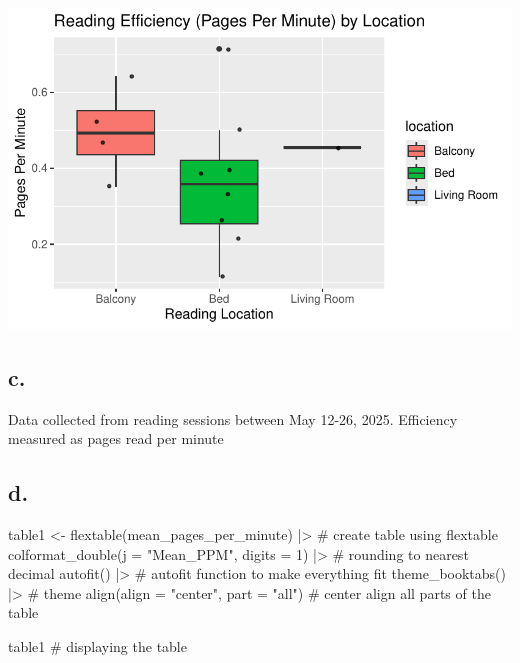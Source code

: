 \documentclass[
  letterpaper,
  DIV=11,
  numbers=noendperiod]{scrartcl}
\newenvironment{Shaded}{\begin{snugshade}}{\end{snugshade}}
\newcommand{\AttributeTok}[1]{\textcolor[rgb]{0.40,0.45,0.13}{#1}}
\newcommand{\CommentTok}[1]{\textcolor[rgb]{0.37,0.37,0.37}{#1}}
\newcommand{\DecValTok}[1]{\textcolor[rgb]{0.68,0.00,0.00}{#1}}
\newcommand{\FunctionTok}[1]{\textcolor[rgb]{0.28,0.35,0.67}{#1}}
\newcommand{\NormalTok}[1]{\textcolor[rgb]{0.00,0.23,0.31}{#1}}
\newcommand{\OtherTok}[1]{\textcolor[rgb]{0.00,0.23,0.31}{#1}}
\newcommand{\SpecialCharTok}[1]{\textcolor[rgb]{0.37,0.37,0.37}{#1}}
\newcommand{\StringTok}[1]{\textcolor[rgb]{0.13,0.47,0.30}{#1}}
\begin{document}
\includegraphics{Untitled_files/figure-pdf/unnamed-chunk-2-1.pdf}

\subsection{c.}\label{c.}

Data collected from reading sessions between May 12-26, 2025. Efficiency
measured as pages read per minute

\subsection{d.}\label{d.}

\begin{Shaded}
\begin{Highlighting}[]
\NormalTok{table1 }\OtherTok{\textless{}{-}} \FunctionTok{flextable}\NormalTok{(mean\_pages\_per\_minute) }\SpecialCharTok{|\textgreater{}} \CommentTok{\# create table using flextable}
  \FunctionTok{colformat\_double}\NormalTok{(}\AttributeTok{j =} \StringTok{"Mean\_PPM"}\NormalTok{, }\AttributeTok{digits =} \DecValTok{1}\NormalTok{) }\SpecialCharTok{|\textgreater{}} \CommentTok{\# rounding to nearest decimal}
  \FunctionTok{autofit}\NormalTok{() }\SpecialCharTok{|\textgreater{}} \CommentTok{\# autofit function to make everything fit}
  \FunctionTok{theme\_booktabs}\NormalTok{() }\SpecialCharTok{|\textgreater{}} \CommentTok{\# theme}
  \FunctionTok{align}\NormalTok{(}\AttributeTok{align =} \StringTok{"center"}\NormalTok{, }\AttributeTok{part =} \StringTok{"all"}\NormalTok{) }\CommentTok{\# center align all parts of the table}

\NormalTok{table1 }\CommentTok{\# displaying the table}
\end{Highlighting}
\end{Shaded}
\end{document}
